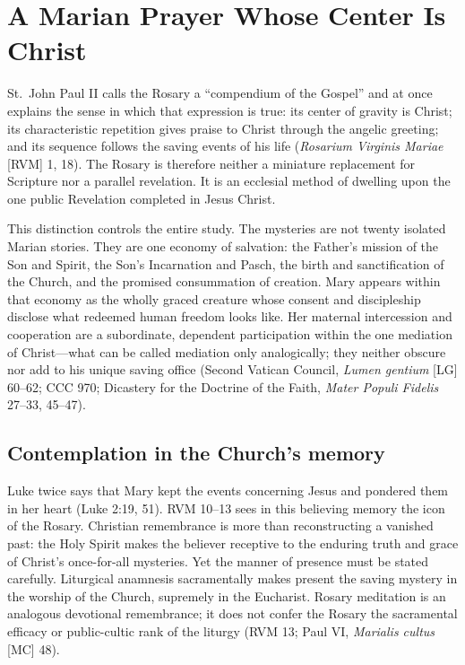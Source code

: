 \section{A Marian Prayer Whose Center Is Christ}


St.~John Paul II calls the Rosary a ``compendium of the Gospel'' and at once explains the sense in which that expression is true: its center of gravity is Christ; its characteristic repetition gives praise to Christ through the angelic greeting; and its sequence follows the saving events of his life (\emph{Rosarium Virginis Mariae} [RVM] 1, 18). The Rosary is therefore neither a miniature replacement for Scripture nor a parallel revelation. It is an ecclesial method of dwelling upon the one public Revelation completed in Jesus Christ.

This distinction controls the entire study. The mysteries are not twenty isolated Marian stories. They are one economy of salvation: the Father's mission of the Son and Spirit, the Son's Incarnation and Pasch, the birth and sanctification of the Church, and the promised consummation of creation. Mary appears within that economy as the wholly graced creature whose consent and discipleship disclose what redeemed human freedom looks like. Her maternal intercession and cooperation are a subordinate, dependent participation within the one mediation of Christ---what can be called mediation only analogically; they neither obscure nor add to his unique saving office (Second Vatican Council, \emph{Lumen gentium} [LG] 60--62; CCC 970; Dicastery for the Doctrine of the Faith, \emph{Mater Populi Fidelis} 27--33, 45--47).

\subsection{Contemplation in the Church's memory}

Luke twice says that Mary kept the events concerning Jesus and pondered them in her heart (Luke 2:19, 51). RVM 10--13 sees in this believing memory the icon of the Rosary. Christian remembrance is more than reconstructing a vanished past: the Holy Spirit makes the believer receptive to the enduring truth and grace of Christ's once-for-all mysteries. Yet the manner of presence must be stated carefully. Liturgical anamnesis sacramentally makes present the saving mystery in the worship of the Church, supremely in the Eucharist. Rosary meditation is an analogous devotional remembrance; it does not confer the Rosary the sacramental efficacy or public-cultic rank of the liturgy (RVM 13; Paul VI, \emph{Marialis cultus} [MC] 48).

